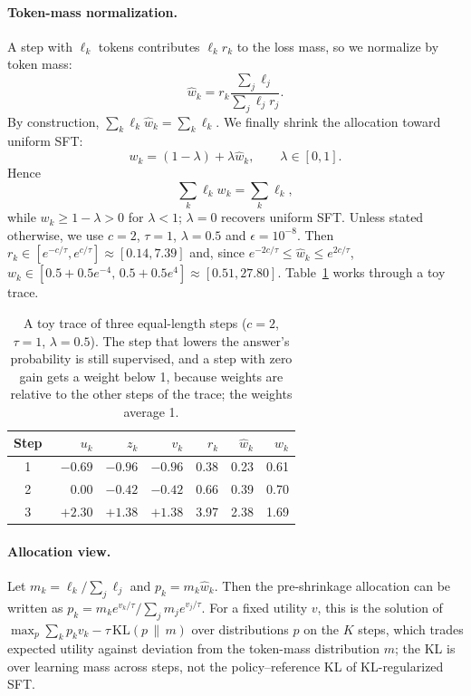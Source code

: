 \paragraph{Token-mass normalization.}
A step with $\ell_k$ tokens contributes $\ell_k r_k$ to the loss mass, so we normalize by token mass:
\begin{equation}
\hat w_k = r_k \frac{\sum_j\ell_j} {\sum_j\ell_jr_j}.
\label{eq:mass}
\end{equation}
By construction, $\sum_k\ell_k\hat w_k=\sum_k\ell_k$. We finally shrink the allocation toward uniform SFT:
\begin{equation}
w_k = (1-\lambda)+\lambda\hat w_k,
\qquad
\lambda\in[0,1].
\label{eq:weights}
\end{equation}
Hence
\begin{equation}
\sum_k\ell_kw_k = \sum_k\ell_k,
\label{eq:budget}
\end{equation}
while $w_k\ge 1-\lambda>0$ for $\lambda<1$; $\lambda=0$ recovers uniform SFT.
Unless stated otherwise, we use $c=2$, $\tau=1$, $\lambda=0.5$ and $\epsilon=10^{-8}$.
Then $r_k\in[e^{-c/\tau},e^{c/\tau}]\approx[0.14,7.39]$ and, since $e^{-2c/\tau}\le\hat w_k\le e^{2c/\tau}$, $w_k\in[0.5+0.5e^{-4},\,0.5+0.5e^{4}]\approx[0.51,27.80]$.
Table~\ref{tab:toy} works through a toy trace.

\begin{table}[t]
  \centering
  \small
  \setlength{\tabcolsep}{4pt}
  \begin{tabular}{crrrrrr}
    \toprule
    Step & $u_k$ & $z_k$ & $v_k$ & $r_k$ & $\hat w_k$ & $w_k$ \\
    \midrule
    1 & $-0.69$ & $-0.96$ & $-0.96$ & 0.38 & 0.23 & 0.61 \\
    2 & $\phantom{+}0.00$ & $-0.42$ & $-0.42$ & 0.66 & 0.39 & 0.70 \\
    3 & $+2.30$ & $+1.38$ & $+1.38$ & 3.97 & 2.38 & 1.69 \\
    \bottomrule
  \end{tabular}
  \caption{A toy trace of three equal-length steps ($c=2$, $\tau=1$, $\lambda=0.5$). The step that lowers the answer's probability is still supervised, and a step with zero gain gets a weight below 1, because weights are relative to the other steps of the trace; the weights average 1.}
  \label{tab:toy}
\end{table}

\paragraph{Allocation view.}
Let $m_k=\ell_k/\sum_j\ell_j$ and $p_k=m_k\hat w_k$. Then the pre-shrinkage allocation can be written as $p_k = m_ke^{v_k/\tau}/\sum_jm_je^{v_j/\tau}$. For a fixed utility $v$, this is the solution of $\max_p\sum_kp_kv_k-\tau\,\mathrm{KL}(p\,\|\,m)$ over distributions $p$ on the $K$ steps, which trades expected utility against deviation from the token-mass distribution $m$; the KL is over learning mass across steps, not the policy--reference KL of KL-regularized SFT.

